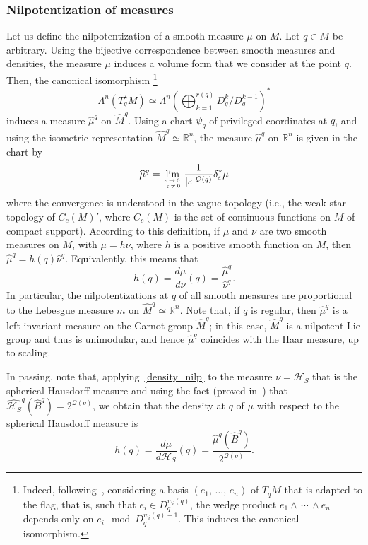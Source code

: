 \documentclass[AHL,Unicode,published]{cedram}
\newcommand*\R{\mathbb{R}}
\newcommand{\calQ}{\mathcal{Q}}
\newcommand{\calH}{\mathcal{H}}
\begin{document}
\subsubsection{Nilpotentization of measures}
Let us define the nilpotentization of a smooth measure $\mu$ on $M$. Let $q\in M$ be arbitrary. Using the bijective correspondence between smooth measures and densities, the measure $\mu$ induces a volume form that we consider at the point $q$. Then, the canonical isomorphism
\footnote{Indeed, following~\cite{ABGR}, considering a basis $(e_1,\,\ldots,\,e_n)$ of $T_{q}M$ that is adapted to the flag, that is, such that $e_i\in D_{q}^{w_i(q)}$, the wedge product $e_1\wedge\,\cdots\,\wedge e_n$ depends only on $e_i\mod D_{q}^{w_i(q)-1}$. This induces the canonical isomorphism.}
\[
\Lambda^n\left(T^\star_{q} M\right) \simeq \Lambda^n\left(\bigoplus_{k=1}^{r(q)} D_{q}^k/D_{q}^{k-1} \right)^*
\]
induces a measure $\widehat{\mu}^{q}$ on $\widehat{M}^{q}$. Using a chart $\psi_{q}$ of privileged coordinates at $q$, and using the isometric representation $\widehat{M}^{q}\simeq\R^n$, the measure $\widehat{\mu}^{q}$ on $\R^n$ is given in the chart by
\[
\widehat{\mu}^{q} = \lim_{\varepsilon\,\rightarrow\,0\,\atop \,\varepsilon\,\neq\,0} \frac{1}{\vert\varepsilon\vert^{\calQ(q)}} \delta_\varepsilon^* \mu
\]
where the convergence is understood in the vague topology (i.e., the weak star topology of $C_c(M)'$, where $C_c(M)$ is the set of continuous functions on $M$ of compact support). According to this definition, if $\mu$ and $\nu$ are two smooth measures on $M$, with $\mu=h\nu$, where $h$ is a positive smooth function on $M$, then $\widehat{\mu}^{q}=h(q)\widehat{\nu}^{q}$. Equivalently, this means that
\begin{equation}\label{density_nilp}
h(q) = \frac{d\mu}{d\nu}(q) = \frac{\widehat{\mu}^{q}}{\widehat{\nu}^{q}}.
\end{equation}
In particular, the nilpotentizations at $q$ of all smooth measures are proportional to the Lebesgue measure $m$ on $\widehat{M}^{q}\simeq\R^n$. Note that, if $q$ is regular, then $\widehat{\mu}^{q}$ is a left-invariant measure on the Carnot group $\widehat{M}^{q}$; in this case, $\widehat{M}^{q}$ is a nilpotent Lie group and thus is unimodular, and hence $\widehat{\mu}^{q}$ coincides with the Haar measure, up to scaling.


In passing, note that, applying~\eqref{density_nilp} to the measure $\nu=\calH_S$ that is the spherical Hausdorff measure and using the fact (proved in~\cite{AgrachevBarilariBoscain_CV2012}) that $\widehat{\calH_S}^{q}(\widehat{B}^{q})=2^{\calQ(q)}$, we obtain that the density at $q$ of $\mu$ with respect to the spherical Hausdorff measure is
\[
h(q) = \frac{d\mu}{d\calH_S}(q) = \frac{\widehat{\mu}^{q}\left(\widehat{B}^{q}\right)}{2^{\calQ(q)}}.
\]
\end{document}
